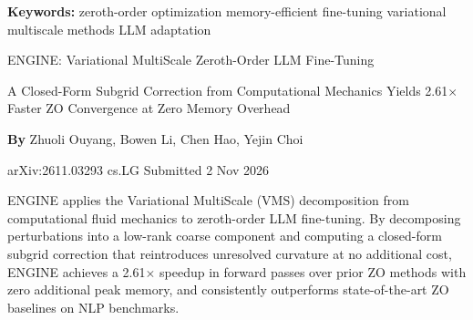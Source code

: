 \documentclass[10pt,twocolumn]{article}
\begin{document}
\setlength{\parindent}{0pt}
\setlength{\parskip}{4pt}

{\small\color{keywordgray}\textbf{Keywords:}
  zeroth-order optimization \textbullet{}
  memory-efficient fine-tuning \textbullet{}
  variational multiscale methods \textbullet{}
  LLM adaptation}\par\vspace{4pt}

{\LARGE\bfseries\raggedright
  ENGINE: Variational MultiScale Zeroth-Order LLM Fine-Tuning}\par\vspace{4pt}

{\large\itshape\raggedright
  A Closed-Form Subgrid Correction from Computational Mechanics Yields
  2.61$\times$ Faster ZO Convergence at Zero Memory Overhead}\par\vspace{6pt}

{\small\textbf{By} Zhuoli Ouyang, Bowen Li, Chen Hao, Yejin Choi}\par\vspace{2pt}

{\small\color{keywordgray}arXiv:2611.03293 \textbullet{}
  cs.LG \textbullet{} Submitted 2 Nov 2026}
\par\vspace{2pt}\noindent{\color{rulered}\rule{\columnwidth}{0.6pt}}\vspace{6pt}

ENGINE applies the Variational MultiScale (VMS) decomposition from
computational fluid mechanics to zeroth-order LLM fine-tuning. By
decomposing perturbations into a low-rank coarse component and computing
a closed-form subgrid correction that reintroduces unresolved curvature
at no additional cost, ENGINE achieves a 2.61$\times$ speedup in forward
passes over prior ZO methods with zero additional peak memory, and
consistently outperforms state-of-the-art ZO baselines on NLP benchmarks.
\end{document}
